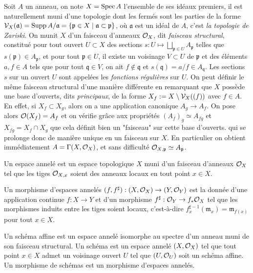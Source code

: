 Soit $A$ un anneau, on note $X=\operatorname{Spec} A$ l'ensemble de ses idéaux premiers, il est naturellement muni d'une topologie dont les fermés sont les parties de la forme $\mathcal{V}_X(\mathfrak{a})=\operatorname{Supp} A/\mathfrak{a}=\lbrace \mathfrak{p}\in X\mid \mathfrak{a}\subset \mathfrak{p}\rbrace$, où $\mathfrak{a}$ est un idéal de $A$, c'est \textit{la topologie de Zariski}. On munit $X$ d'un faisceau d'anneaux $\mathcal{O}_X$, dit \textit{faisceau structural}, constitué pour tout ouvert $U\subset X$ des sections $s: U\mapsto \bigsqcup_{\mathfrak{p}\in U}A_\mathfrak{p}$ telles que $s(\mathfrak{p})\in A_\mathfrak{p}$, et pour tout $\mathfrak{p}\in U$, il existe un voisinage $V\subset U$ de $\mathfrak{p}$ et des éléments $a,f\in A$ tels que pour tout $\mathfrak{q}\in V$, on ait $f\notin \mathfrak{q}$ et $s(\mathfrak{q})=a/f\in A_\mathfrak{q}$. Les sections $s$ sur un ouvert $U$ sont appelées les \textit{fonctions régulières} sur $U$. On peut définir le même faisceau structural d'une manière différente en remarquant que $X$ possède une base d'ouverts, dits \textit{principaux}, de la forme $X_f:=X\setminus \mathcal{V}_X((f))$ avec $f\in A$. En effet, si $X_f\subset X_g$, alors on a une application canonique $A_g\rightarrow A_f$. On pose alors $\mathcal{O}(X_f)=A_f$ et on vérifie grâce aux propriétés $(A_f)_g\simeq A_{fg}$ et $X_{fg}=X_f\cap X_g$ que cela définit bien un "faisceau" sur cette base d'ouverts. qui se prolonge donc de manière unique en un faisceau sur $X$. En particulier on obtient immédiatement $A=\Gamma(X, \mathcal{O}_X)$, et sans difficulté $\mathcal{O}_{X,\mathfrak{p}}\simeq A_\mathfrak{p}$. 

\begin{defn}
Un espace annelé est un espace topologique $X$ muni d'un faisceau d'anneaux $\mathcal{O}_X$ tel que les tiges $\mathcal{O}_{X,x}$ soient des anneaux locaux en tout point $x\in X$.

Un morphisme d'espaces annelés $(f, f^\sharp):(X,\mathcal{O}_X)\rightarrow (Y,\mathcal{O}_Y)$ est la donnée d'une application continue $f:X\rightarrow Y$ et d'un morphisme $f^\sharp:\mathcal{O}_Y\rightarrow f_*\mathcal{O}_X$ tel que les morphismes induits entre les tiges soient locaux, c'est-à-dire $f^{\sharp -1}_x(\mathfrak{m}_x)=\mathfrak{m}_{f(x)}$ pour tout $x\in X$.
\end{defn}

\begin{defn}
Un schéma affine est un espace annelé isomorphe au spectre d'un anneau muni de son faisceau structural. Un schéma est un espace annelé $(X,\mathcal{O}_X)$ tel que tout point $x\in X$ admet un voisinage ouvert $U$ tel que $(U,\mathcal{O}_U)$ soit un schéma affine. Un morphisme de schémas est un morphisme d'espaces annelés.
\end{defn}

